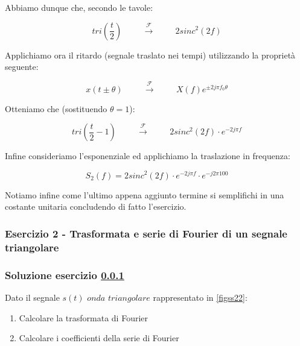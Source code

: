 \documentclass[../main.tex]{subfiles}
\begin{document}
Abbiamo dunque che, secondo le tavole:

\begin{equation}
	\unit{tri}\left( \frac{t}{2}\right) \hspace{1cm} \xrightarrow{\mathcal{F}}  \hspace{1cm}  2\unit{sinc}^2(2f)
\end{equation}

Applichiamo ora il ritardo (segnale traslato nei tempi) utilizzando la proprietà seguente:

\begin{equation}
	x(t \pm \theta)  \hspace{1cm} \xrightarrow{\mathcal{F}}  \hspace{1cm} X(f) e^{\pm 2 j \pi f_0 \theta}
\end{equation}

Otteniamo che (sostituendo $\theta = 1$):

\begin{equation}
	\unit{tri}\left( \frac{t}{2} - 1 \right) \hspace{1cm} \xrightarrow{\mathcal{F}}  \hspace{1cm}  2\unit{sinc}^2(2f) \cdot e^{- 2 j \pi f}
\end{equation}

Infine consideriamo l'esponenziale ed applichiamo la traslazione in frequenza:

\begin{equation}
	S_2(f) =  2\unit{sinc}^2(2f) \cdot e^{- 2 j \pi f} \cdot e^{-j2 \pi 100 }
\end{equation}

Notiamo infine come l'ultimo appena aggiunto termine si semplifichi in una costante unitaria concludendo di fatto l'esercizio.


\vspace*{1.5cm}
\subsubsection{Esercizio 2 - Trasformata e serie di Fourier di un segnale triangolare}
\label{ss22}

\subsubsection*{Soluzione esercizio \ref{ss22}}

Dato il segnale  $s(t)$ $onda$ $triangolare$ rappresentato in \autoref{figss22}:

\begin{enumerate}
	\item Calcolare la trasformata di Fourier
	\item Calcolare i coefficienti della serie di Fourier
\end{enumerate}
\end{document}

